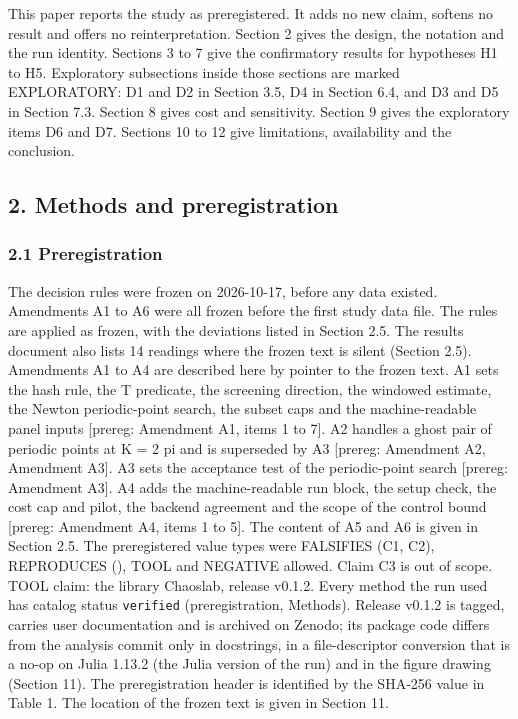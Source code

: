 \documentclass[
  11pt,
]{article}
\begin{document}
This paper reports the study as preregistered. It adds no new claim,
softens no result and offers no reinterpretation. Section 2 gives the
design, the notation and the run identity. Sections 3 to 7 give the
confirmatory results for hypotheses H1 to H5. Exploratory subsections
inside those sections are marked EXPLORATORY: D1 and D2 in Section 3.5,
D4 in Section 6.4, and D3 and D5 in Section 7.3. Section 8 gives cost
and sensitivity. Section 9 gives the exploratory items D6 and D7.
Sections 10 to 12 give limitations, availability and the conclusion.

\subsection{2. Methods and
preregistration}\label{methods-and-preregistration}

\subsubsection{2.1 Preregistration}\label{preregistration}

The decision rules were frozen on 2026-10-17, before any data existed.
Amendments A1 to A6 were all frozen before the first study data file.
The rules are applied as frozen, with the deviations listed in Section
2.5. The results document also lists 14 readings where the frozen text
is silent (Section 2.5). Amendments A1 to A4 are described here by
pointer to the frozen text. A1 sets the hash rule, the T predicate, the
screening direction, the windowed estimate, the Newton periodic-point
search, the subset caps and the machine-readable panel inputs {[}prereg:
Amendment A1, items 1 to 7{]}. A2 handles a ghost pair of periodic
points at K = 2 pi and is superseded by A3 {[}prereg: Amendment A2,
Amendment A3{]}. A3 sets the acceptance test of the periodic-point
search {[}prereg: Amendment A3{]}. A4 adds the machine-readable run
block, the setup check, the cost cap and pilot, the backend agreement
and the scope of the control bound {[}prereg: Amendment A4, items 1 to
5{]}. The content of A5 and A6 is given in Section 2.5. The
preregistered value types were FALSIFIES (C1, C2), REPRODUCES
(\citep{SalaArtuso2015}), TOOL and NEGATIVE allowed. Claim C3 is out of
scope. TOOL claim: the library Chaoslab, release v0.1.2. Every method
the run used has catalog status \texttt{verified} (preregistration,
Methods). Release v0.1.2 is tagged, carries user documentation and is
archived on Zenodo; its package code differs from the analysis commit
only in docstrings, in a file-descriptor conversion that is a no-op on
Julia 1.13.2 (the Julia version of the run) and in the figure drawing
(Section 11). The preregistration header is identified by the SHA-256
value in Table 1. The location of the frozen text is given in Section
11.
\end{document}
